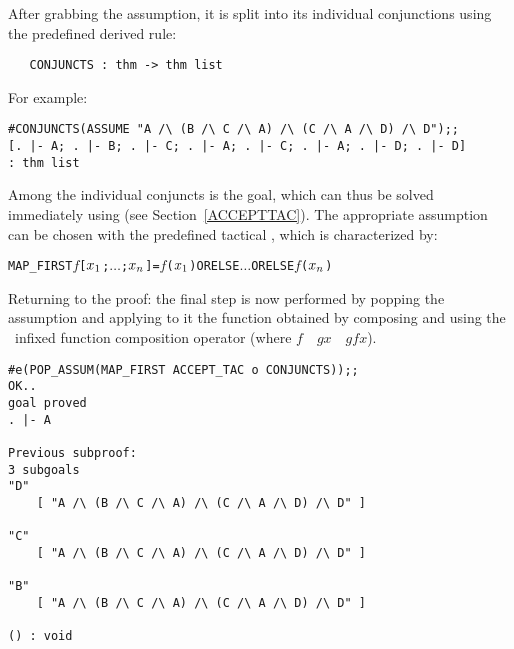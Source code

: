 After grabbing the assumption, it is split into its individual conjunctions
using the predefined derived rule:

\begin{hol}\begin{verbatim}
   CONJUNCTS : thm -> thm list
\end{verbatim}\end{hol}

\noindent For example:


\begin{session}\begin{verbatim}
#CONJUNCTS(ASSUME "A /\ (B /\ C /\ A) /\ (C /\ A /\ D) /\ D");;
[. |- A; . |- B; . |- C; . |- A; . |- C; . |- A; . |- D; . |- D]
: thm list
\end{verbatim}\end{session}

\noindent Among the individual conjuncts is the goal, which can thus be
solved immediately using  (see Section~\ref{ACCEPTTAC}).
The appropriate assumption can be chosen with the predefined tactical
, which
is characterized by:

\begin{hol}\begin{alltt}
   MAP_FIRST \(f\) [\(x\sb{1}\); \(\ldots\) ;\(x\sb{n}\)]  =  \(f\)(\(x\sb{1}\)) ORELSE \(\ldots\) ORELSE \(f\)(\(x\sb{n}\))
\end{alltt}\end{hol}

\noindent Returning to the proof: the final step is now performed by
popping the assumption and applying to it the function obtained by
composing  and  using the \ML\ infixed
function composition operator  
(where \ml{(}$f$~~$g$\ml{)}$x$~\ml{=}~$g$\ml{(}$f$\ml{(}$x$\ml{))}).

\begin{session}\begin{verbatim}
#e(POP_ASSUM(MAP_FIRST ACCEPT_TAC o CONJUNCTS));;
OK..
goal proved
. |- A

Previous subproof:
3 subgoals
"D"
    [ "A /\ (B /\ C /\ A) /\ (C /\ A /\ D) /\ D" ]

"C"
    [ "A /\ (B /\ C /\ A) /\ (C /\ A /\ D) /\ D" ]

"B"
    [ "A /\ (B /\ C /\ A) /\ (C /\ A /\ D) /\ D" ]

() : void
\end{verbatim}\end{session}


